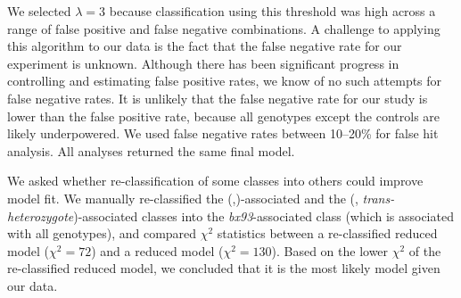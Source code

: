 We selected $\lambda=3$ because classification using this threshold was high
across a range of false positive and false negative combinations. A challenge to
applying this algorithm to our data is the fact that the false negative rate for
our experiment is unknown. Although there has been significant progress in
controlling and estimating false positive rates, we know of no such attempts for
false negative rates. It is unlikely that the false negative rate for our study
is lower than the false positive rate, because all genotypes except the controls
are likely underpowered. We used false negative rates between 10--20\% for false
hit analysis. All analyses returned the same final model.

We asked whether re-classification of some classes into others could improve
model fit. We manually re-classified the (\sy{},\bx{})-associated and the (\bx,
\emph{trans-heterozygote})-associated classes into the \emph{bx93}-associated
class (which is associated with all genotypes), and compared $\chi^2$ statistics
between a re-classified reduced model ($\chi^2=72$) and a reduced model
($\chi^2=130$). Based on the lower $\chi^2$ of the re-classified reduced model,
we concluded that it is the most likely model given our data.

